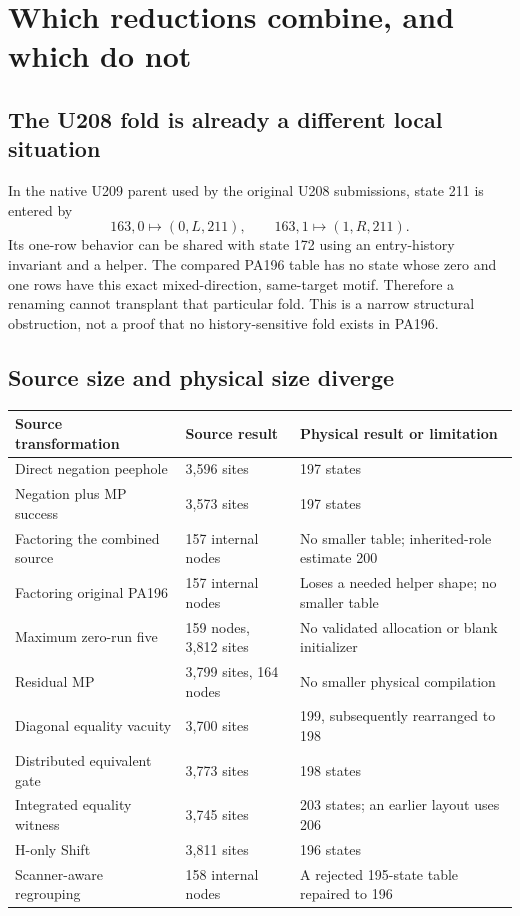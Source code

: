 \documentclass[11pt,letterpaper]{article}
\begin{document}
\section{Which reductions combine, and which do not}

\subsection{The U208 fold is already a different local situation}

In the native U209 parent used by the original U208 submissions, state 211
is entered by
\[
 163,0\mapsto(0,L,211),\qquad
 163,1\mapsto(1,R,211).
\]
Its one-row behavior can be shared with state 172 using an entry-history
invariant and a helper. The compared PA196 table has no state whose zero and
one rows have this exact mixed-direction, same-target motif. Therefore a
renaming cannot transplant that particular fold. This is a narrow structural
obstruction, not a proof that no history-sensitive fold exists in PA196.

\subsection{Source size and physical size diverge}

\begin{center}
\small
\begin{tabular}{@{}p{2.3in}p{1.55in}p{2.25in}@{}}
\toprule
Source transformation & Source result & Physical result or limitation\\
\midrule
Direct negation peephole & 3,596 sites & 197 states\\
Negation plus MP success & 3,573 sites & 197 states\\
Factoring the combined source & 157 internal nodes & No smaller table; inherited-role estimate 200\\
Factoring original PA196 & 157 internal nodes & Loses a needed helper shape; no smaller table\\
Maximum zero-run five & 159 nodes, 3,812 sites & No validated allocation or blank initializer\\
Residual MP & 3,799 sites, 164 nodes & No smaller physical compilation\\
Diagonal equality vacuity & 3,700 sites & 199, subsequently rearranged to 198\\
Distributed equivalent gate & 3,773 sites & 198 states\\
Integrated equality witness & 3,745 sites & 203 states; an earlier layout uses 206\\
H-only Shift & 3,811 sites & 196 states\\
Scanner-aware regrouping & 158 internal nodes & A rejected 195-state table repaired to 196\\
\bottomrule
\end{tabular}
\end{center}
\end{document}
